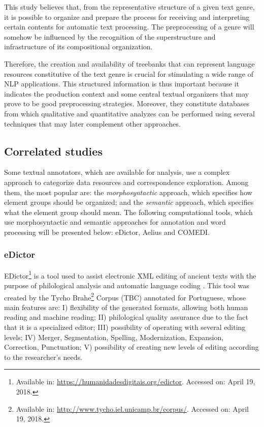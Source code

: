 \documentclass[english]{textolivre}
\begin{document}
This study believes that, from the representative structure of a given text genre, it is possible to organize and prepare the process for receiving and interpreting certain contents for automatic text processing. The preprocessing of a genre will somehow be influenced by the recognition of the superstructure and infrastructure of its compositional organization.

Therefore, the creation and availability of treebanks that can represent language resources constitutive of the text genre is crucial for stimulating a wide range of NLP applications. This structured information is thus important because it indicates the production context and some central textual organizers that may prove to be good preprocessing strategies. Moreover, they constitute databases from which qualitative and quantitative analyzes can be performed using several techniques that may later complement other approaches. 

\subsection{Correlated studies}\label{sec-titulo}
Some textual annotators, which are available for analysis, use a complex approach to categorize data resources and correspondence exploration. Among them, the most popular are: the \textit{morphosyntactic} approach, which specifies how element groups should be organized; and the \textit{semantic} approach, which specifies what the element group should mean. The following computational tools, which use morphosyntactic and semantic approaches for annotation and word processing will be presented below: eDictor, Aelius and COMEDI.

\subsubsection{eDictor}\label{sec-autores}

EDictor\footnote{Available in: \url{https://humanidadesdigitais.org/edictor}. Accessed on: April 19, 2018.} is a tool used to assist electronic XML editing of ancient texts with the purpose of philological analysis and automatic language coding \cite{sousa_o_2014}. This tool was created by the Tycho Brahe\footnote{Available in: \url{http://www.tycho.iel.unicamp.br/corpus/}. Accessed on: April 19, 2018.} Corpus (TBC) annotated for Portuguese, whose main features are: I) flexibility of the generated formats, allowing both human reading and machine reading; II) philological quality assurance due to the fact that it is a specialized editor; III) possibility of operating with several editing levels; IV) Merger, Segmentation, Spelling, Modernization, Expansion, Correction, Punctuation; V) possibility of creating new levels of editing according to the researcher’s needs.
\end{document}
